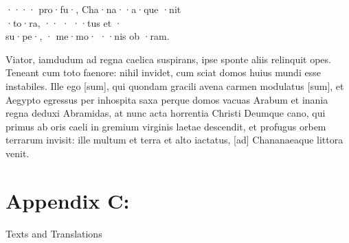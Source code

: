 \documentclass[20pt, twoside]{extarticle}
\begin{document}
\begin{singlespace}
\begin{en}
\begin{spacing}{1.9}
\begin{pages}
\begin{Leftside}
		···· pro·fu·, Cha·na··a·que ·nit\\
		·to·ra, ·· · ··tus et ·\\
		 su·pe·, · me·mo· ··nis ob ·ram.
	\pend
	\endnumbering
\end{Leftside}
\begin{Rightside}
	\beginnumbering
		\noindent\skipR
		Viator, iamdudum ad regna caelica suspirans, ipse sponte aliis relinquit opes. Teneant cum toto faenore: nihil invidet, cum sciat domos huius mundi esse instabiles.
	\pend
		\noindent\skipR
		Ille ego {[}sum{]}, qui quondam gracili avena carmen modulatus {[}sum{]}, et Aegypto egressus per inhospita saxa perque domos vacuas Arabum et inania regna deduxi Abramidas, at nunc acta horrentia Christi Deumque cano, qui primus ab oris caeli in gremium virginis laetae descendit, et profugus orbem terrarum invisit: ille multum et terra et alto iactatus, {[}ad{]} Chananaeaque littora venit.
	\pend
	\endnumbering
\end{Rightside}
\end{pages}
\Pages
\end{spacing}



\clearpage
\setlength{\parskip}{0em}
\small
\thispagestyle{empty}
\part[Appendix C: Texts and Translations]{Appendix C:}
{\LARGE\centering Texts and Translations\par}

\vspace{2em}
\raggedright
\setlength{\parskip}{.3em plus .1em minus .1em}


\end{en}
\end{singlespace}
\end{document}
